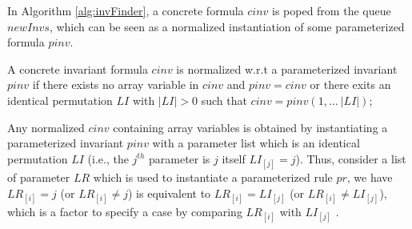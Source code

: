 \documentclass{llncs}
\newcommand\lyj[1]{\textcolor{magenta}{lyj: #1}}
\begin{document}
In Algorithm \ref{alg:invFinder}, a concrete formula $cinv$ is poped from the queue $newInvs$, which can be seen as a normalized instantiation of some parameterized formula $pinv$. %


\begin{definition}
A  concrete invariant formula $cinv$ is normalized w.r.t a parameterized invariant $pinv$ if  there exists no array variable in $cinv$ and $pinv=cinv$ or there exits an identical permutation $LI$ with $|LI|>0$ such that $cinv=pinv(1,...~|LI|)$;

\end{definition}

Any normalized $cinv$ containing array variables is obtained by instantiating a parameterized invariant $pinv$ with a parameter list which is an identical permutation $LI$ (i.e., the $j^{th}$ parameter is $j$ itself $LI_{[j]}=j$). Thus, consider a list of parameter $LR$ which is used to instantiate a parameterized rule $pr$, we  have $LR_{[i]}=j$ (or $LR_{[i]}\ne j$) is equivalent to $LR_{[i]}=LI_{[j]}$ (or $LR_{[i]}\ne LI_{[j]}$), %
which is a factor to specify a case by comparing $LR_{[i]}$ with $LI_{[j]}$ .  %
\end{document}
